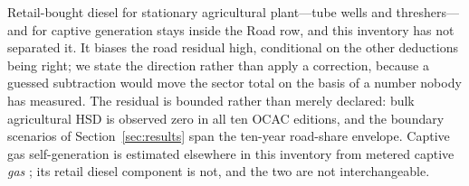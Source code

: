 Retail-bought diesel for stationary agricultural plant---tube wells and threshers---and
for captive generation stays inside the Road row, and this inventory has not separated
it. It biases the road residual high, conditional on the other deductions being right;
we state the direction rather than apply a correction, because a guessed subtraction
would move the sector total on the basis of a number nobody has measured. The residual
is bounded rather than merely declared: bulk agricultural HSD is observed zero in all
ten OCAC editions, and the boundary scenarios of Section~\ref{sec:results} span the
ten-year road-share envelope. Captive gas self-generation is estimated elsewhere in
this inventory from metered captive \emph{gas} \citep{ahmad2026national}; its retail
diesel component is not, and the two are not interchangeable.
